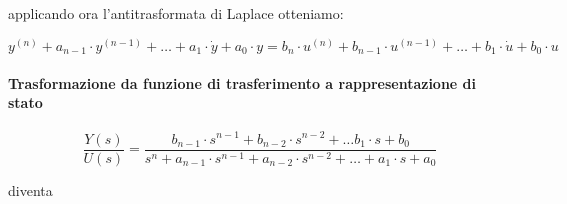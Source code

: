 \documentclass[11pt]{article}
\begin{document}
    applicando ora l'antitrasformata di Laplace otteniamo:

\begin{equation}
    y^{(n)} + a_{n-1} \cdot y^{(n-1)} + \dots + a_1 \cdot \dot{y} + a_0 \cdot y = b_n \cdot u^{(n)} + b_{n-1} \cdot u^{(n-1)} + \dots + b_1 \cdot \dot{u} + b_0 \cdot u
\end{equation}

    \hypertarget{trasformazione-da-funzione-di-trasferimento-a-rappresentazione-di-stato}{%
\paragraph{Trasformazione da funzione di trasferimento a
rappresentazione di
stato}\label{trasformazione-da-funzione-di-trasferimento-a-rappresentazione-di-stato}}

\begin{equation}
    \frac{Y(s)}{U(s)} = \frac{b_{n-1} \cdot s^{n-1} + b_{n-2} \cdot s^{n-2} + \dots b_1 \cdot s + b_0}{s^n + a_{n-1} \cdot s^{n-1} + a_{n-2} \cdot s^{n-2} + \dots + a_1 \cdot s + a_0}
\end{equation}

diventa
\end{document}
